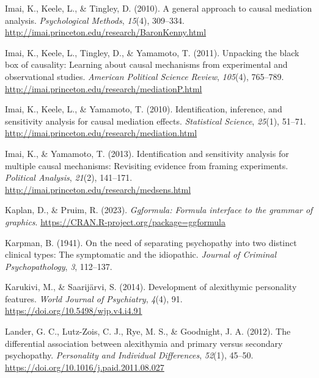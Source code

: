 \documentclass[
  man,floatsintext]{apa7}
\newlength{\cslhangindent}
\newlength{\cslentryspacingunit} %
\newenvironment{CSLReferences}[2] %
 {%
  \setlength{\parindent}{0pt}
  \ifodd #1
  \let\oldpar\par
  \def\par{\hangindent=\cslhangindent\oldpar}
  \fi
  \setlength{\parskip}{#2\cslentryspacingunit}
 }%
 {}
\begin{document}
\begin{CSLReferences}{1}{0}
\leavevmode{}%
Imai, K., Keele, L., \& Tingley, D. (2010). A general approach to causal mediation analysis. \emph{Psychological Methods}, \emph{15}(4), 309--334. \url{http://imai.princeton.edu/research/BaronKenny.html}

\leavevmode{}%
Imai, K., Keele, L., Tingley, D., \& Yamamoto, T. (2011). Unpacking the black box of causality: Learning about causal mechanisms from experimental and observational studies. \emph{American Political Science Review}, \emph{105}(4), 765--789. \url{http://imai.princeton.edu/research/mediationP.html}

\leavevmode{}%
Imai, K., Keele, L., \& Yamamoto, T. (2010). Identification, inference, and sensitivity analysis for causal mediation effects. \emph{Statistical Science}, \emph{25}(1), 51--71. \url{http://imai.princeton.edu/research/mediation.html}

\leavevmode{}%
Imai, K., \& Yamamoto, T. (2013). Identification and sensitivity analysis for multiple causal mechanisms: Revisiting evidence from framing experiments. \emph{Political Analysis}, \emph{21}(2), 141--171. \url{http://imai.princeton.edu/research/medsens.html}

\leavevmode{}%
Kaplan, D., \& Pruim, R. (2023). \emph{Ggformula: Formula interface to the grammar of graphics}. \url{https://CRAN.R-project.org/package=ggformula}

\leavevmode{}%
Karpman, B. (1941). On the need of separating psychopathy into two distinct clinical types: The symptomatic and the idiopathic. \emph{Journal of Criminal Psychopathology}, \emph{3}, 112--137.

\leavevmode{}%
Karukivi, M., \& Saarijärvi, S. (2014). Development of alexithymic personality features. \emph{World Journal of Psychiatry}, \emph{4}(4), 91. \url{https://doi.org/10.5498/wjp.v4.i4.91}

\leavevmode{}%
Lander, G. C., Lutz-Zois, C. J., Rye, M. S., \& Goodnight, J. A. (2012). The differential association between alexithymia and primary versus secondary psychopathy. \emph{Personality and Individual Differences}, \emph{52}(1), 45--50. \url{https://doi.org/10.1016/j.paid.2011.08.027}


\end{CSLReferences}
\end{document}
